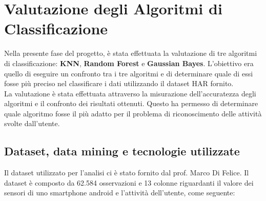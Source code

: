 \documentclass[../../Report.tex]{subfiles}
\begin{document}
\chapter{Valutazione degli Algoritmi di Classificazione}
Nella presente fase del progetto, è stata effettuata la valutazione di tre algoritmi di classificazione: \textbf{KNN}, \textbf{Random Forest} e \textbf{Gaussian Bayes}. L'obiettivo era quello di eseguire un confronto tra i tre algoritmi e di determinare quale di essi fosse più preciso nel classificare i dati utilizzando il dataset HAR fornito.\\
La valutazione è stata effettuata attraverso la misurazione dell'accuratezza degli algoritmi e il confronto dei risultati ottenuti. Questo ha permesso di determinare quale algoritmo fosse il più adatto per il problema di riconoscimento delle attività svolte dall'utente.\\   

\section{Dataset, data mining e tecnologie utilizzate}
Il dataset utilizzato per l'analisi ci è stato fornito dal prof. Marco Di Felice. Il dataset è composto da 62.584 osservazioni e 13 colonne riguardanti il valore dei sensori di uno smartphone android e l'attività dell'utente, come seguente:
\end{document}
